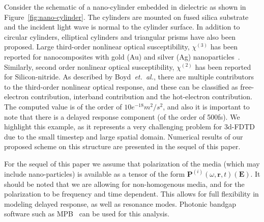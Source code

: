 \documentclass{article}[12pt]
\theoremstyle{plain}
\begin{document}
Consider the schematic of a nano-cylinder embedded in dielectric as shown in Figure~\ref{fig:nano-cylinder}.
The cylinders are mounted on fused silica substrate and the incident light wave is normal to the cylinder
surface. In addition to circular cylinders, elliptical cylinders and triangular prisms have also been
proposed.
Large third-order nonlinear optical susceptibility, $\chi^{(3)}$ has been reported for nanocomposites with 
gold (Au) and silver (Ag) nanoparticles~\cite{saonov1999nondegenerate,boyd2014third}. Similarly, second order
nonlinear optical susceptibility, $\chi^{(2)}$ has been reported for Silicon-nitride. As described 
by Boyd~\emph{et.~al.}, there are multiple contributors to the third-order nonlinear optical response, and
these can be classified as free-electron contribution, interband contribution and the hot-electron
contribution. The computed value is of the order of $10e^{-18}m^2/s^2$, and also it is important to note
that there is a delayed response component (of the order of 500fs). We highlight this example, as it 
represents a very challenging problem for 3d-FDTD due to the small timestep and large spatial domain.
Numerical results of our proposed scheme on this structure are presented in the sequel of this paper.

For the sequel of this paper we assume that polarization of the media (which may include nano-particles)
is available as a tensor of the form $\mathbf{P}^{(i)}(\omega,\mathbf{r},t)(\mathbf{E})$. It should be noted
that we are allowing for non-homogenous media, and for the polarization to be frequency and time dependent.
This allows for full flexibility in modeling delayed response, as well as resonance modes.  Photonic
bandgap software such as MPB~\cite{johnson2001block} can be used for this analysis.
\end{document}

